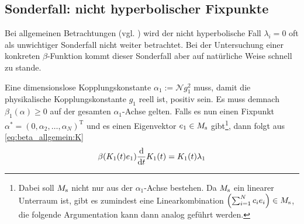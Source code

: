   \subsection{Sonderfall: nicht hyperbolischer Fixpunkte}
    Bei allgemeinen Betrachtungen (vgl. \cite{Weinberg:1976}) 
    wird der nicht hyperbolische Fall $\lambda_i = 0$ oft als unwichtiger Sonderfall nicht 
    weiter betrachtet. Bei der Untersuchung einer konkreten $\beta$-Funktion kommt dieser 
    Sonderfall aber auf natürliche Weise schnell zu stande.
    
    Eine dimensionslose Kopplungskonstante $\alpha_1:=\mathcal{N}g_1^2$ muss, damit die 
    physikalische Kopplungskonstante $g_1$ reell ist, positiv sein. Es muss demnach 
    $\beta_1(\alpha)\geq 0$ auf der gesamten $\alpha_1$-Achse gelten. Falls es nun einen 
    Fixpunkt $\alpha^*=(0,\alpha_2,\ldots,\alpha_N)^\text{T}$ und es einen Eigenvektor
    $e_1\in M_\text{s}$ gibt\footnote{Dabei 
    soll $M_\text{s}$ nicht nur aus der $\alpha_1$-Achse bestehen. Da $M_\text{s}$ ein linearer Unterraum 
    ist, gibt es zumindest eine Linearkombination $\left(\sum_{i=1}^N c_ie_i\right)\in M_\text{s}$, die 
    folgende Argumentation kann dann analog geführt werden.},
    dann folgt aus \eqref{eq:beta_allgemein:K}
    \begin{equation}
     \beta(K_1(t)e_1) \frac{\text{d}}{\text{d} t} K_1(t) = K_1(t) \lambda_1
    \end{equation}

  
    



      


  
  
  
  

